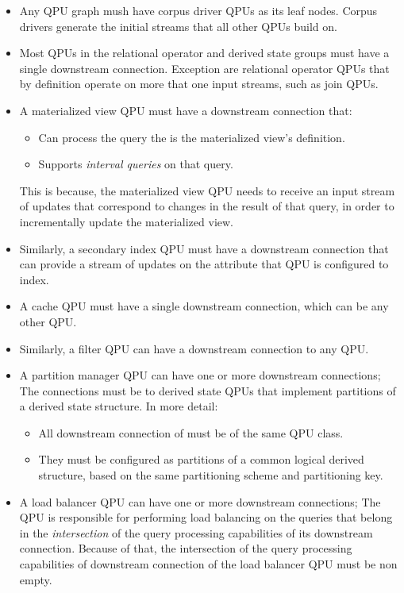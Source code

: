 \begin{itemize}
  \item Any QPU graph mush have corpus driver QPUs as its leaf nodes.
  Corpus drivers generate the initial streams that all other QPUs build on.

  \item Most QPUs in the relational operator and derived state groups must have a single downstream connection.
  Exception are relational operator QPUs that by definition operate on more that one input streams, such as join QPUs.

  \item A materialized view QPU must have a downstream connection that:
  \begin{itemize}
    \item Can process the query the is the materialized view's definition.
    \item Supports \textit{interval queries} on that query.
  \end{itemize}
  This is because, the materialized view QPU needs to receive an input stream of updates that correspond to changes in
  the result of that query, in order to incrementally update the materialized view.

  \item Similarly, a secondary index QPU must have a downstream connection that can provide a stream of updates on the
  attribute that QPU is configured to index.

  \item A cache QPU must have a single downstream connection, which can be any other QPU.

  \item Similarly, a filter QPU can have a downstream connection to any QPU.

  \item A partition manager QPU can have one or more downstream connections;
  The connections must be to derived state QPUs that implement partitions of a derived state structure.
  In more detail:
  \begin{itemize}
    \item All downstream connection of must be of the same QPU class.

    \item They must be configured as partitions of a common logical derived structure, based on the same partitioning
    scheme and partitioning key.
  \end{itemize}

  \item A load balancer QPU can have one or more downstream connections;
  The QPU is responsible for performing load balancing on the queries that belong in the \textit{intersection} of the
  query processing capabilities of its downstream connection.
  Because of that, the intersection of the query processing capabilities of downstream connection of the load balancer
  QPU must be non empty.
\end{itemize}

